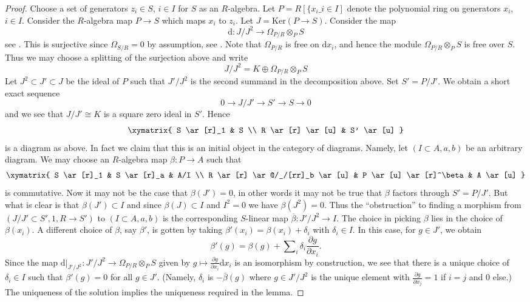 \begin{proof}
Choose a set of generators $z_i \in S$, $i \in I$ for $S$ as an $R$-algebra.
Let $P = R[\{x_i\_{i \in I}]$ denote the polynomial ring on generators
$x_i$, $i \in I$. Consider the $R$-algebra map $P \to S$ which maps
$x_i$ to $z_i$. Let $J = \text{Ker}(P \to S)$. Consider the map
$$
\text{d} : J/J^2 \longrightarrow \Omega_{P/R} \otimes_P S
$$
see
.
This is surjective since $\Omega_{S/R} = 0$ by assumption, see
.
Note that $\Omega_{P/R}$ is free on $\text{d}x_i$, and hence the module
$\Omega_{P/R} \otimes_P S$ is free over $S$. Thus we may choose a splitting
of the surjection above and write
$$
J/J^2 = K \oplus \Omega_{P/R} \otimes_P S
$$
Let $J^2 \subset J' \subset J$ be the ideal of $P$ such that
$J'/J^2$ is the second summand in the decomposition above.
Set $S' = P/J'$. We obtain a short exact sequence
$$
0 \to J/J' \to S' \to S \to 0
$$
and we see that $J/J' \cong K$ is a square zero ideal in $S'$. Hence
$$
\xymatrix{
S \ar[r]_1 & S \\
R \ar[r] \ar[u] & S' \ar[u]
}
$$
is a diagram as above. In fact we claim that this is an initial object in
the category of diagrams. Namely, let $(I \subset A, a, b)$ be an arbitrary
diagram. We may choose an $R$-algebra map $\beta : P \to A$ such that
$$
\xymatrix{
S \ar[r]_1 & S \ar[r]_a & A/I \\
R \ar[r] \ar@/_/[rr]_b \ar[u] & P \ar[u] \ar[r]^\beta & A \ar[u]
}
$$
is commutative. Now it may not be the case that $\beta(J') = 0$, in other
words it may not be true that $\beta$ factors through $S' = P/J'$.
But what is clear is that $\beta(J') \subset I$ and
since $\beta(J) \subset I$ and $I^2 = 0$ we have $\beta(J^2) = 0$.
Thus the ``obstruction'' to finding a morphism from
$(J/J' \subset S', 1, R \to S')$ to $(I \subset A, a, b)$ is
the corresponding $S$-linear map $\overline{\beta} : J'/J^2 \to I$.
The choice in picking $\beta$ lies in the choice of $\beta(x_i)$.
A different choice of $\beta$, say $\beta'$, is gotten by taking
$\beta'(x_i) = \beta(x_i) + \delta_i$ with $\delta_i \in I$.
In this case, for $g \in J'$, we obtain
$$
\beta'(g) =
\beta(g) + \sum\nolimits_i \delta_i \frac{\partial g}{\partial x_i}.
$$
Since the map $\text{d}|_{J'/J^2} : J'/J^2 \to \Omega_{P/R} \otimes_P S$
given by $g \mapsto \frac{\partial g}{\partial x_i}\text{d}x_i$
is an isomorphism by construction, we see that there is a unique choice
of $\delta_i \in I$ such that $\beta'(g) = 0$ for all $g \in J'$.
(Namely, $\delta_i$ is $-\overline{\beta}(g)$ where $g \in J'/J^2$
is the unique element with $\frac{\partial g}{\partial x_j} = 1$ if
$i = j$ and $0$ else.) The uniqueness of the solution implies the
uniqueness required in the lemma.
\end{proof}

